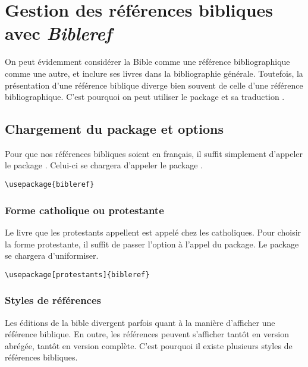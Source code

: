 \chapter{Gestion des références bibliques avec \emph{Bibleref}}

\begin{prealable}

On peut évidemment considérer la Bible comme une référence bibliographique comme une autre, et inclure ses livres dans la bibliographie générale.
Toutefois, la présentation d'une référence biblique diverge bien souvent de celle d'une référence bibliographique.
C'est pourquoi on peut utiliser le package  et sa traduction .
\end{prealable}


\section{Chargement du package et options}

Pour que nos références bibliques soient en français, il suffit simplement d'appeler le package . Celui-ci se chargera d'appeler le package .


\begin{verbatim}
\usepackage{bibleref}
\end{verbatim}

\subsection{Forme catholique ou protestante}
Le livre que les protestants appellent  est appelé  chez les catholiques. Pour choisir la forme protestante, il suffit de passer l'option  à l'appel du package. Le package se chargera d'uniformiser.

\begin{verbatim}
\usepackage[protestants]{bibleref}
\end{verbatim}

\subsection{Styles de références}

Les éditions de la bible divergent parfois quant à la manière d'afficher une référence biblique. En outre, les références peuvent s'afficher tantôt en version abrégée, tantôt en version complète. C'est pourquoi il existe  plusieurs styles de références bibliques. 


